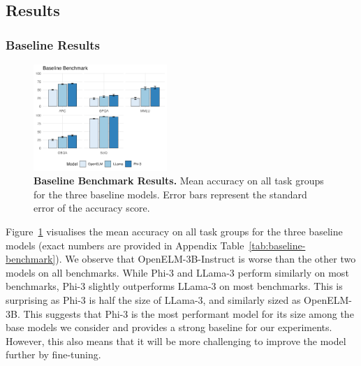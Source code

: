 \subsection{Results}
\label{subsec:results}



\subsubsection{Baseline Results}

\begin{figure}[ht]
    \centering
    \includegraphics[width=0.45\textwidth]{figures/baseline-benchmark.png}
    \caption{\textbf{Baseline Benchmark Results.} Mean accuracy on all task groups for the three baseline models. Error bars represent the standard error of the accuracy score.}
    \label{fig:baseline-benchmark}
\end{figure}

Figure~\ref{fig:baseline-benchmark} visualises the mean accuracy on all task
groups for the three baseline models (exact numbers are provided in
Appendix Table~\ref{tab:baseline-benchmark}). We observe that OpenELM-3B-Instruct
is worse than the other two models on all benchmarks. While Phi-3 and
LLama-3 perform similarly on most benchmarks, Phi-3 slightly
outperforms LLama-3 on most benchmarks. This is surprising as
Phi-3 is half the size of LLama-3, and similarly
sized as OpenELM-3B. This suggests that Phi-3 is the most performant model for its size among the base models
we consider and provides a strong baseline for our
experiments. However, this also means that it will be more challenging to
improve the model further by fine-tuning.

